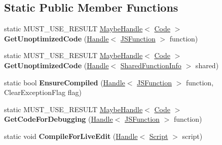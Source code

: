 \subsection*{Static Public Member Functions}
\begin{DoxyCompactItemize}
\item 
\hypertarget{classv8_1_1internal_1_1_compiler_aa1f7d71e408b642e1e30578c1fd6aed4}{}static M\+U\+S\+T\+\_\+\+U\+S\+E\+\_\+\+R\+E\+S\+U\+L\+T \hyperlink{classv8_1_1internal_1_1_maybe_handle}{Maybe\+Handle}$<$ \hyperlink{classv8_1_1internal_1_1_code}{Code} $>$ {\bfseries Get\+Unoptimized\+Code} (\hyperlink{classv8_1_1internal_1_1_handle}{Handle}$<$ \hyperlink{classv8_1_1internal_1_1_j_s_function}{J\+S\+Function} $>$ function)\label{classv8_1_1internal_1_1_compiler_aa1f7d71e408b642e1e30578c1fd6aed4}

\item 
\hypertarget{classv8_1_1internal_1_1_compiler_a98ad83545963f5bc71feb16f303b19a5}{}static M\+U\+S\+T\+\_\+\+U\+S\+E\+\_\+\+R\+E\+S\+U\+L\+T \hyperlink{classv8_1_1internal_1_1_maybe_handle}{Maybe\+Handle}$<$ \hyperlink{classv8_1_1internal_1_1_code}{Code} $>$ {\bfseries Get\+Unoptimized\+Code} (\hyperlink{classv8_1_1internal_1_1_handle}{Handle}$<$ \hyperlink{classv8_1_1internal_1_1_shared_function_info}{Shared\+Function\+Info} $>$ shared)\label{classv8_1_1internal_1_1_compiler_a98ad83545963f5bc71feb16f303b19a5}

\item 
\hypertarget{classv8_1_1internal_1_1_compiler_a9e7cf35d77fa2a0819c9b18082bf3760}{}static bool {\bfseries Ensure\+Compiled} (\hyperlink{classv8_1_1internal_1_1_handle}{Handle}$<$ \hyperlink{classv8_1_1internal_1_1_j_s_function}{J\+S\+Function} $>$ function, Clear\+Exception\+Flag flag)\label{classv8_1_1internal_1_1_compiler_a9e7cf35d77fa2a0819c9b18082bf3760}

\item 
\hypertarget{classv8_1_1internal_1_1_compiler_ad56509e22298e9e9c3e1cccf5f2847bb}{}static M\+U\+S\+T\+\_\+\+U\+S\+E\+\_\+\+R\+E\+S\+U\+L\+T \hyperlink{classv8_1_1internal_1_1_maybe_handle}{Maybe\+Handle}$<$ \hyperlink{classv8_1_1internal_1_1_code}{Code} $>$ {\bfseries Get\+Code\+For\+Debugging} (\hyperlink{classv8_1_1internal_1_1_handle}{Handle}$<$ \hyperlink{classv8_1_1internal_1_1_j_s_function}{J\+S\+Function} $>$ function)\label{classv8_1_1internal_1_1_compiler_ad56509e22298e9e9c3e1cccf5f2847bb}

\item 
\hypertarget{classv8_1_1internal_1_1_compiler_abceb28bb354bb38a248392d9df0d262d}{}static void {\bfseries Compile\+For\+Live\+Edit} (\hyperlink{classv8_1_1internal_1_1_handle}{Handle}$<$ \hyperlink{classv8_1_1internal_1_1_script}{Script} $>$ script)\label{classv8_1_1internal_1_1_compiler_abceb28bb354bb38a248392d9df0d262d}


\end{DoxyCompactItemize}
